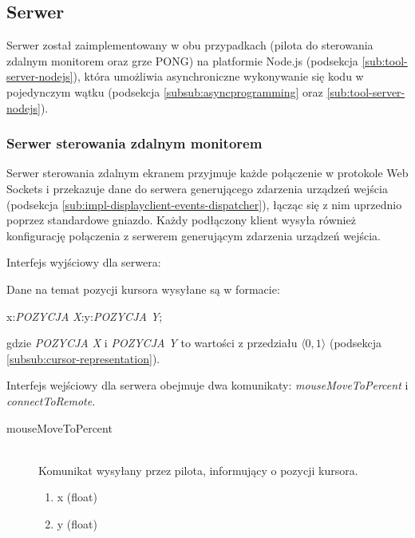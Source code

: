 \subsection{Serwer}

Serwer został zaimplementowany w obu przypadkach (pilota do sterowania zdalnym monitorem oraz grze PONG) na platformie Node.js (podsekcja \ref{sub:tool-server-nodejs}), która umożliwia asynchroniczne wykonywanie się kodu w pojedynczym wątku (podsekcja \ref{subsub:asyncprogramming} oraz \ref{sub:tool-server-nodejs}).

\subsubsection{Serwer sterowania zdalnym monitorem}

Serwer sterowania zdalnym ekranem przyjmuje każde połączenie w protokole Web Sockets i przekazuje dane do serwera generującego zdarzenia urządzeń wejścia (podsekcja \ref{sub:impl-displayclient-events-dispatcher}), łącząc się z nim uprzednio poprzez standardowe gniazdo. Każdy podłączony klient wysyła również konfigurację połączenia z serwerem generującym zdarzenia urządzeń wejścia.

\par \hfill

\noindent
Interfejs wyjściowy dla serwera:

\par \hfill

\noindent
Dane na temat pozycji kursora wysyłane są w formacie:

\par \hfill

\noindent
x:\emph{POZYCJA X}:y:\emph{POZYCJA Y};

\par \hfill

\noindent
gdzie \emph{POZYCJA X} i \emph{POZYCJA Y} to wartości z przedziału \(\langle0, 1\rangle\) (podsekcja \ref{subsub:cursor-representation}).

\par \hfill

Interfejs wejściowy dla serwera obejmuje dwa komunikaty: \emph{mouseMoveToPercent} i \emph{connectToRemote}.

\begin{description}
	\item[mouseMoveToPercent] \hfill \\
	Komunikat wysyłany przez pilota, informujący o pozycji kursora.
	\begin{enumerate}
		\item x (float)
		\item y (float)
	\end{enumerate}
\end{description}

